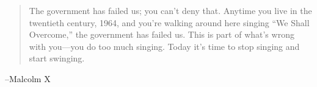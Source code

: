 \documentclass{exam}
\begin{document}
  \else
    \vspace{10 cm}
    \begin{quote}
      \begin{em}
        The government has failed us; you can't deny that. Anytime you live in the twentieth century, 1964, and you're
        walking around here singing ``We Shall Overcome,'' the government has failed us. This is part of what's wrong with
        you---you do too much singing.  Today it's time to stop singing and start swinging. 
        
      \end{em}
    \end{quote}
    \hspace{1 cm} --Malcolm X
  \fi
\end{document}
